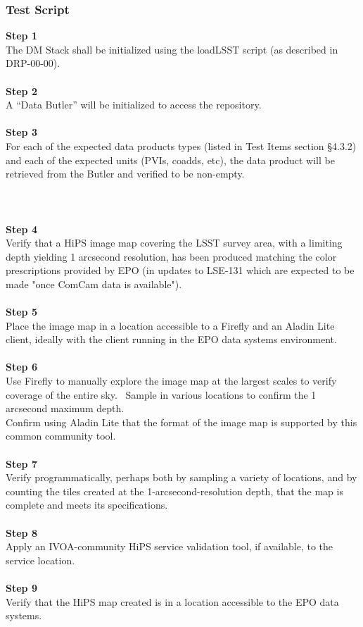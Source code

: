 \hypertarget{test-script-40}{%
\subsubsection{Test Script}\label{test-script-40}}

\textbf{Step 1}\\
The DM Stack shall be initialized using the loadLSST script (as
described in DRP-00-00).\\
~\\
\textbf{Step 2}\\
A ``Data Butler'' will be initialized to access the repository.\\
~\\
\textbf{Step 3}\\
For each of the expected data products types (listed in Test Items
section §4.3.2) and each of the expected units (PVIs, coadds, etc), the
data product will be retrieved from the Butler and verified to be
non-empty.\\
~\\
~\\
~\\
\textbf{Step 4}\\
Verify that a HiPS image map covering the LSST survey area, with a
limiting depth yielding 1 arcsecond resolution, has been produced
matching the color prescriptions provided by EPO (in updates to LSE-131
which are expected to be made "once ComCam data is available").\\
~\\
\textbf{Step 5}\\
Place the image map in a location accessible to a Firefly and an Aladin
Lite client, ideally with the client running in the EPO data systems
environment.\\
~\\
\textbf{Step 6}\\
Use Firefly to manually explore the image map at the largest scales to
verify coverage of the entire sky. ~Sample in various locations to
confirm the 1 arcsecond maximum depth.\\
Confirm using Aladin Lite that the format of the image map is supported
by this common community tool.\\
~\\
\textbf{Step 7}\\
Verify programmatically, perhaps both by sampling a variety of
locations, and by counting the tiles created at the
1-arcsecond-resolution depth, that the map is complete and meets its
specifications.\\
~\\
\textbf{Step 8}\\
Apply an IVOA-community HiPS service validation tool, if available, to
the service location.\\
~\\
\textbf{Step 9}\\
Verify that the HiPS map created is in a location accessible to the EPO
data systems.\\
~\\

